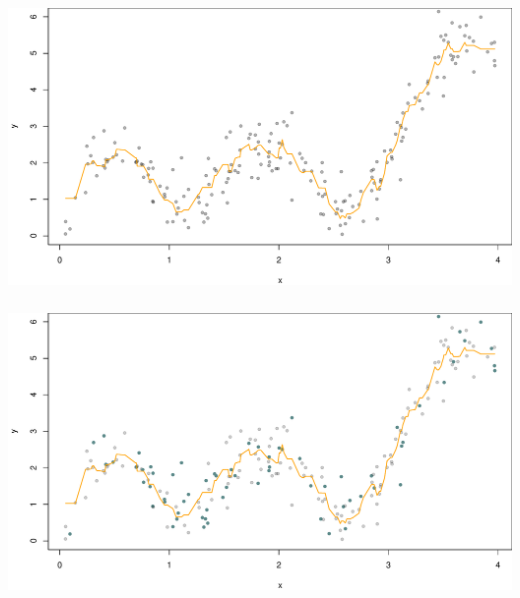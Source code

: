 \documentclass[xetex,mathserif,serif,aspectratio=169]{beamer}
\begin{document}
\begin{frame}[fragile] \frametitle{} \oldB \small

\begin{center}
\includegraphics[width=\textwidth]{img/valid5.pdf}
\end{center}

\end{frame}

\begin{frame}[fragile] \frametitle{} \oldB \small

\begin{center}
\includegraphics[width=\textwidth]{img/valid6.pdf}
\end{center}

\end{frame}
\end{document}
